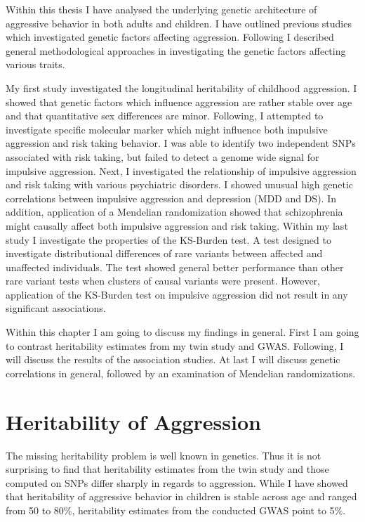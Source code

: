 
Within this thesis I have analysed the underlying genetic architecture of aggressive behavior in both adults and children.
I have outlined previous studies which investigated genetic factors affecting aggression.
Following I described general methodological approaches in investigating the genetic factors affecting various traits.

My first study investigated the longitudinal heritability of childhood aggression.
I showed that genetic factors which influence aggression are rather stable over age and that quantitative sex differences are minor.
Following, I attempted to investigate specific molecular marker which might influence both impulsive aggression and risk taking behavior.
I was able to identify two independent SNPs associated with risk taking, but failed to detect a genome wide signal for impulsive aggression.
Next, I investigated the relationship of impulsive aggression and risk taking with various psychiatric disorders.
I showed unusual high genetic correlations between impulsive aggression and depression (MDD and DS).
In addition, application of a Mendelian randomization showed that schizophrenia might causally affect both impulsive aggression and risk taking.
Within my last study I investigate the properties of the KS-Burden test.
A test designed to investigate distributional differences of rare variants between affected and unaffected individuals.
The test showed general better performance than other rare variant tests when clusters of causal variants were present.
However, application of the KS-Burden test on impulsive aggression did not result in any significant associations.

Within this chapter I am going to discuss my findings in general.
First I am going to contrast heritability estimates from  my twin study and GWAS\@.
Following, I will discuss the results of the association studies.
At last I will discuss genetic correlations in general, followed by an examination of Mendelian randomizations.

\section{Heritability of Aggression}
\label{sec:heritability_of_aggression}

The missing heritability problem is well known in genetics.
Thus it is not surprising to find that heritability estimates from the twin study and those computed on SNPs differ sharply in regards to aggression.
While I have showed that heritability of aggressive behavior in children is stable across age and ranged from 50 to 80\%, heritability estimates from the conducted GWAS point to 5\%. 

